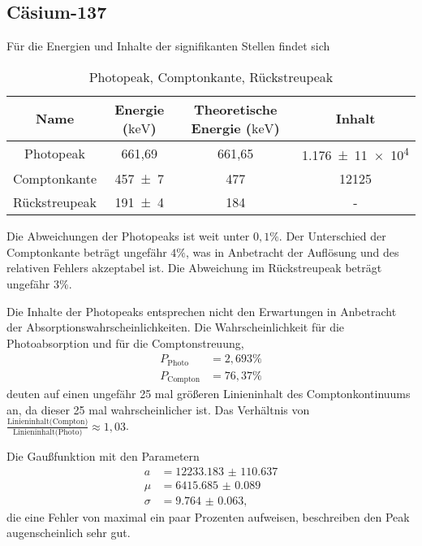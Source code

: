 \subsection{Cäsium-137}

Für die Energien und Inhalte der signifikanten Stellen findet sich
\begin{table}[H]
    \centering
    \caption{Photopeak, Comptonkante, Rückstreupeak}
    \label{tab:fit}
    \begin{tabular}{c c c c}
        \toprule
        {Name} & {Energie ($\si{\kilo\electronvolt}$)} & Theoretische Energie ($\si{\kilo\electronvolt}$) & Inhalt \\
        \midrule
        {Photopeak} & 661,69 & 661,65 & \num{1,176(11)e4} \\
        {Comptonkante} & \num{457(7)} & 477 & 12125 \\
        {Rückstreupeak} & \num{191(4)} & 184 & {-} \\
        \bottomrule
    \end{tabular}
\end{table}

Die Abweichungen der Photopeaks ist weit unter $0,1 \%$. Der Unterschied der Comptonkante beträgt ungefähr $4 \%$, was in Anbetracht der Auflösung und des relativen Fehlers akzeptabel ist.
Die Abweichung im Rückstreupeak beträgt ungefähr $3 \%$. 

Die Inhalte der Photopeaks entsprechen nicht den Erwartungen in Anbetracht der Absorptionswahrscheinlichkeiten. Die Wahrscheinlichkeit für die Photoabsorption und für die Comptonstreuung,
\begin{align}
    P_\text{Photo} &= 2,693 \% \\
    P_\text{Compton} &= 76,37 \%
\end{align}
deuten auf einen ungefähr 25 mal größeren Linieninhalt des Comptonkontinuums an, da dieser 25 mal wahrscheinlicher ist.
Das Verhältnis von $\frac{\text{Linieninhalt(Compton)}}{\text{Linieninhalt(Photo)}} \approx 1,03$.


Die Gaußfunktion mit den Parametern
\begin{align}
    a &= \num{12233.183(110637)} \\
    \mu &= \num{6415.685(89)} \\
    \sigma &= \num{9.764(63)},
\end{align}
die eine Fehler von maximal ein paar Prozenten aufweisen, beschreiben den Peak augenscheinlich sehr gut. \\

